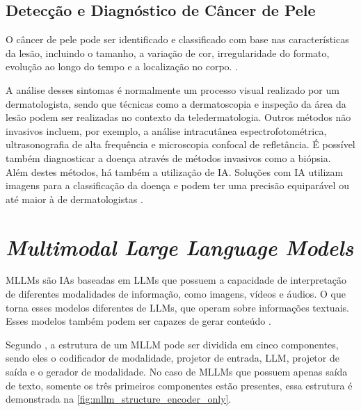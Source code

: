 \subsection{Detecção e Diagnóstico de Câncer de Pele}

O câncer de pele pode ser identificado e classificado com base nas características da lesão, incluindo o tamanho, a variação de cor, irregularidade do formato,
evolução ao longo do tempo e a localização no corpo. \cite{recognizing_skin_cancer}.

A análise desses sintomas é normalmente um processo visual realizado por um dermatologista, sendo que técnicas como a dermatoscopia e inspeção da área da lesão podem
ser realizadas no contexto da teledermatologia. Outros métodos não invasivos incluem, por exemplo, a análise intracutânea espectrofotométrica, ultrasonografia de alta
frequência e microscopia confocal de refletância. É possível também diagnosticar a doença através de métodos invasivos como a biópsia. Além destes métodos, há também a
utilização de \ac{IA}. Soluções com \ac{IA} utilizam imagens para a classificação da doença e podem ter uma precisão equiparável ou até maior à de dermatologistas
\cite{recognizing_skin_cancer, skin_cancer_ai}.

\section{\textit{Multimodal Large Language Models}}

\acp{MLLM} são \acp{IA} baseadas em \acp{LLM} que possuem a capacidade de interpretação de diferentes modalidades de informação, como imagens, vídeos e áudios.
O que torna esses modelos diferentes de \acp{LLM}, que operam sobre informações textuais. Esses modelos também podem ser capazes de gerar conteúdo
\cite{mllm_survey_2023, mllm_survey_2024}.

Segundo \textcite{mllm_survey_2024}, a estrutura de um \ac{MLLM} pode ser dividida em cinco componentes, sendo eles o codificador de modalidade, projetor de entrada,
\ac{LLM}, projetor de saída e o gerador de modalidade. No caso de \acp{MLLM} que possuem apenas saída de texto, somente os três primeiros componentes estão presentes,
essa estrutura é demonstrada na \autoref{fig:mllm_structure_encoder_only}.

